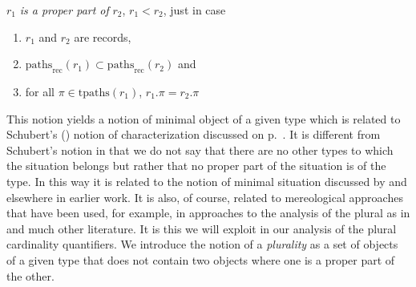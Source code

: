\begin{shaded}
\begin{ex}
  $r_1$ \textit{is a proper
    part of} $r_2$, $r_1<r_2$, just in case
  \begin{enumerate}
  \item $r_1$ and $r_2$ are records, 
  \item
    $\mathrm{paths}_{\text{rec}}(r_1)\subset\mathrm{paths}_{\text{rec}}(r_2)$
      and
    \item for all $\pi\in\mathrm{tpaths}(r_1)$, $r_1.\pi=r_2.\pi$
    \end{enumerate}

    
    
 
 
\label{ex:properpart}   
\end{ex}
\end{shaded}
    



This notion yields a notion of minimal object of a given type which is related to Schubert's
(\citeyear{Schubert2000}) notion of characterization discussed on 
p.~\pageref{pg:Schubert-characterize}.  It is different from Schubert's notion in
that we do not say that there are no other types to which the
situation belongs but rather that no proper part of the situation is
of the type.  In this way it is related to the notion of minimal
situation discussed by \cite{Kratzer2014} and elsewhere in earlier
work. It is also, of course, related to mereological approaches that
have been used, for example,  in approaches to the analysis of the
plural as in \cite{Krifka1990} and much other literature.  It is this
we will exploit in our analysis of the plural cardinality
quantifiers.  We introduce the notion of a \textit{plurality} as a set of
objects of a given type that does not contain two objects
where one is a proper part of the other. 

